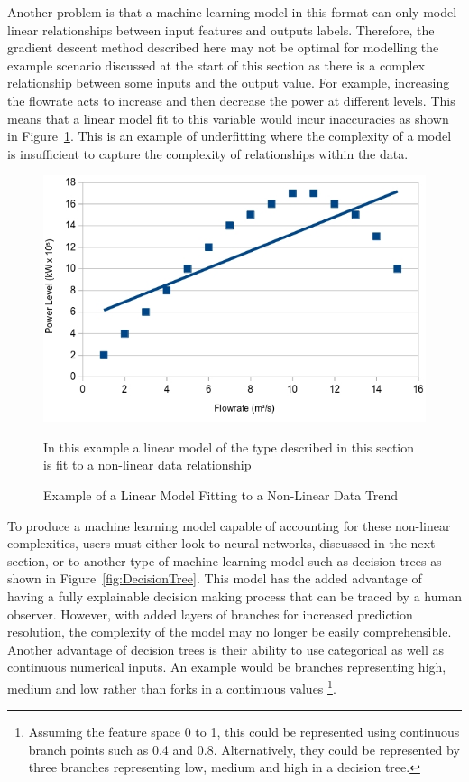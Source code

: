 \noindent
Another problem is that a machine learning model in this format can only model linear relationships between input features and outputs labels. Therefore, the gradient descent method described here may not be optimal for modelling the example scenario discussed at the start of this section as there is a complex relationship between some inputs and the output value. For example, increasing the flowrate acts to increase and then decrease the power at different levels. This means that a linear model fit to this variable would incur inaccuracies as shown in Figure~\ref{fig:linearFit}. This is an example of underfitting \cite{koehrsen2018overfitting} where the complexity of a model is insufficient to capture the complexity of relationships within the data. \\		


\begin{figure}[h]
	\centering
	\includegraphics[scale=0.45]{Figures/LinearFit.jpg}
	\caption{Example of a Linear Model Fitting to a Non-Linear Data Trend} {In this example a linear model of the type described in this section is fit to a non-linear data relationship}
	\label{fig:linearFit}
\end{figure}

 
 \noindent
 To produce a machine learning model capable of accounting for these non-linear complexities, users must either look to neural networks, discussed in the next section, or to another type of machine learning model such as decision trees \cite{de2013decision} as shown in Figure~\ref{fig:DecisionTree}. This model has the added advantage of having a fully explainable decision making process that can be traced by a human observer. However, with added layers of branches for increased prediction resolution, the complexity of the model may no longer be easily comprehensible. Another advantage of decision trees is their ability to use categorical as well as continuous numerical inputs. An example would be branches representing high, medium and low rather than forks in a continuous values \footnote{Assuming the feature space 0 to 1, this could be represented using continuous branch points such as 0.4 and 0.8. Alternatively, they could be represented by three branches representing low, medium and high in a decision tree. }.
 
